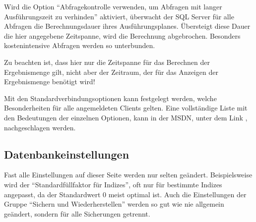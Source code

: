         Wird die Option \enquote{Abfragekontrolle verwenden, um Abfragen mit
        langer Ausführungszeit zu verhinden} aktiviert, überwacht der SQL
        Server für alle Abfragen die Berechnungsdauer ihres Ausführungsplanes.
        Übersteigt diese Dauer die hier angegebene Zeitspanne,
        wird die Berechnung abgebrochen. Besonders kostenintensive Abfragen
        werden so unterbunden.
        \begin{merke}
          Zu beachten ist, dass hier nur die Zeitspanne für das Berechnen der
          Ergebnismenge gilt, nicht aber der Zeitraum, der für das Anzeigen
          der Ergebnismenge benötigt wird!
        \end{merke}
        
        Mit den Standardverbindungsoptionen kann festgelegt werden, welche
        Besonderheiten für alle angemeldeten Clients gelten. Eine vollständige
        Liste mit den Bedeutungen der einzelnen Optionen, kann in der MSDN,
        unter dem Link \parencite{ms180124}, nachgeschlagen werden.          
        \begin{literaturinternet}
          \item \cite{ms180124}
        \end{literaturinternet}          
      \subsection{Datenbankeinstellungen}
        Fast alle Einstellungen auf dieser Seite werden nur selten geändert.
        Beispielsweise wird der \enquote{Standardfüllfaktor für Indizes}, oft
        nur für bestimmte Indizes angepasst, da der Standardwert 0 meist
        optimal ist. Auch die Einstellungen der Gruppe \enquote{Sichern und
        Wiederherstellen} werden so gut wie nie allgemein geändert, sondern für
        alle Sicherungen getrennt.
        \begin{literaturinternet}
          \item \cite{ms178521}
        \end{literaturinternet}          
